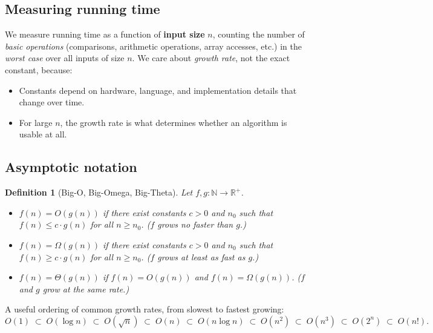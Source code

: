 \documentclass[11pt]{article}
\newtheorem{definition}[theorem]{Definition}
\begin{document}
\subsection{Measuring running time}

We measure running time as a function of \textbf{input size} $n$, counting the number of
\emph{basic operations} (comparisons, arithmetic operations, array accesses, etc.) in the
\emph{worst case} over all inputs of size $n$. We care about \emph{growth rate}, not the
exact constant, because:

\begin{itemize}
    \item Constants depend on hardware, language, and implementation details that change
    over time.
    \item For large $n$, the growth rate is what determines whether an algorithm is usable
    at all.
\end{itemize}

\subsection{Asymptotic notation}

\begin{definition}[Big-O, Big-Omega, Big-Theta]
Let $f, g : \mathbb{N} \to \mathbb{R}^{+}$.
\begin{itemize}
    \item $f(n) = O(g(n))$ if there exist constants $c > 0$ and $n_0$ such that
    $f(n) \le c \cdot g(n)$ for all $n \ge n_0$. (\emph{$f$ grows no faster than $g$.})
    \item $f(n) = \Omega(g(n))$ if there exist constants $c > 0$ and $n_0$ such that
    $f(n) \ge c \cdot g(n)$ for all $n \ge n_0$. (\emph{$f$ grows at least as fast as $g$.})
    \item $f(n) = \Theta(g(n))$ if $f(n) = O(g(n))$ and $f(n) = \Omega(g(n))$.
    (\emph{$f$ and $g$ grow at the same rate.})
\end{itemize}
\end{definition}

A useful ordering of common growth rates, from slowest to fastest growing:
\[
  O(1) \;\subset\; O(\log n) \;\subset\; O(\sqrt{n}) \;\subset\; O(n) \;\subset\; O(n \log n)
  \;\subset\; O(n^2) \;\subset\; O(n^3) \;\subset\; O(2^n) \;\subset\; O(n!).
\]
\end{document}
